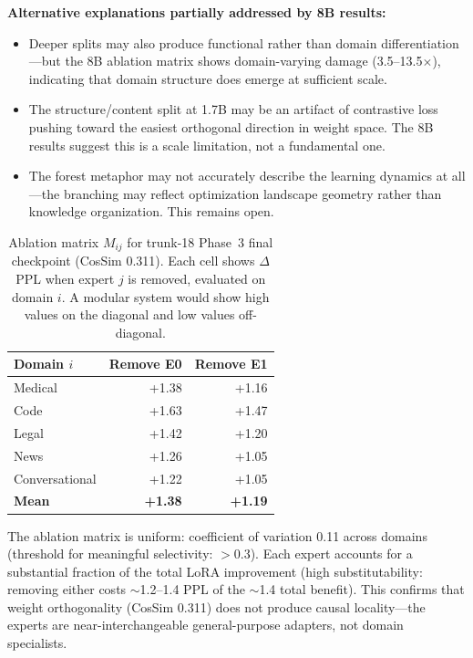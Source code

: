 \documentclass{article}
\begin{document}
\textbf{Alternative explanations partially addressed by 8B results:}
\begin{itemize}
    \item Deeper splits may also produce functional rather than domain
          differentiation---but the 8B ablation matrix shows domain-varying
          damage (3.5--13.5$\times$), indicating that domain structure does
          emerge at sufficient scale.
    \item The structure/content split at 1.7B may be an artifact of contrastive
          loss pushing toward the easiest orthogonal direction in weight space.
          The 8B results suggest this is a scale limitation, not a fundamental one.
    \item The forest metaphor may not accurately describe the learning dynamics
          at all---the branching may reflect optimization landscape geometry
          rather than knowledge organization. This remains open.
\end{itemize}

\begin{table}[h]
\centering
\caption{Ablation matrix $M_{ij}$ for trunk-18 Phase~3 final checkpoint
(CosSim 0.311). Each cell shows $\Delta$PPL when expert $j$ is removed,
evaluated on domain $i$. A modular system would show high values on the
diagonal and low values off-diagonal.}
\label{tab:ablation-matrix}
\begin{tabular}{@{}lrr@{}}
\toprule
Domain $i$ & Remove E0 & Remove E1 \\
\midrule
Medical       & +1.38 & +1.16 \\
Code          & +1.63 & +1.47 \\
Legal         & +1.42 & +1.20 \\
News          & +1.26 & +1.05 \\
Conversational & +1.22 & +1.05 \\
\midrule
\textbf{Mean} & \textbf{+1.38} & \textbf{+1.19} \\
\bottomrule
\end{tabular}
\end{table}

The ablation matrix is uniform: coefficient of variation 0.11 across domains
(threshold for meaningful selectivity: $>$0.3). Each expert accounts for a substantial fraction of the total LoRA improvement
(high substitutability: removing either costs $\sim$1.2--1.4 PPL of the
$\sim$1.4 total benefit). This confirms that
weight orthogonality (CosSim 0.311) does not produce causal locality---the
experts are near-interchangeable general-purpose adapters, not domain
specialists.
\end{document}
